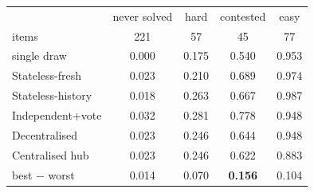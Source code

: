 \begin{tabular}{lcccc}
\toprule
& never solved & hard & contested & easy \\
items & 221 & 57 & 45 & 77 \\
single draw & 0.000 & 0.175 & 0.540 & 0.953 \\
\midrule
Stateless-fresh & 0.023 & 0.210 & 0.689 & 0.974 \\
Stateless-history & 0.018 & 0.263 & 0.667 & 0.987 \\
Independent+vote & 0.032 & 0.281 & 0.778 & 0.948 \\
Decentralised & 0.023 & 0.246 & 0.644 & 0.948 \\
Centralised hub & 0.023 & 0.246 & 0.622 & 0.883 \\
\midrule
best $-$ worst & 0.014 & 0.070 & \textbf{0.156} & 0.104 \\
\bottomrule
\end{tabular}
